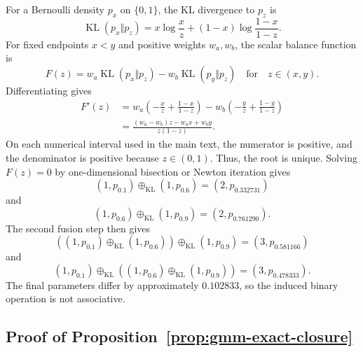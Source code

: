 \documentclass[runningheads]{llncs}
\newcommand{\KL}{\operatorname{KL}}
\begin{document}
For a Bernoulli density $p_x$ on $\{0,1\}$, the KL divergence to $p_z$ is
\begin{equation*}
  \KL(p_x\Vert p_z)=x\log\frac{x}{z}+(1-x)\log\frac{1-x}{1-z}.
\end{equation*}
For fixed endpoints $x<y$ and positive weights $w_a,w_b$, the scalar balance function is
\begin{equation*}
  F(z)=w_a\KL(p_x\Vert p_z)-w_b\KL(p_y\Vert p_z)
  \quad\text{for}\quad z\in(x,y).
\end{equation*}
Differentiating gives
\begin{align*}
  F'(z)
  &=w_a\left(-\frac{x}{z}+\frac{1-x}{1-z}\right)
    -w_b\left(-\frac{y}{z}+\frac{1-y}{1-z}\right)\\
  &=\frac{(w_a-w_b)z-w_ax+w_by}{z(1-z)}.
\end{align*}
On each numerical interval used in the main text, the numerator is positive, and the denominator is positive because $z\in(0,1)$. Thus, the root is unique. Solving $F(z)=0$ by one-dimensional bisection or Newton iteration gives
\begin{equation*}
  (1,p_{0.1})\oplus_{\KL}(1,p_{0.6})=(2,p_{0.332731})
\end{equation*}
and
\begin{equation*}
  (1,p_{0.6})\oplus_{\KL}(1,p_{0.9})=(2,p_{0.761290}).
\end{equation*}
The second fusion step then gives
\begin{equation*}
  ((1,p_{0.1})\oplus_{\KL}(1,p_{0.6}))\oplus_{\KL}(1,p_{0.9})=(3,p_{0.581166})
\end{equation*}
and
\begin{equation*}
  (1,p_{0.1})\oplus_{\KL}((1,p_{0.6})\oplus_{\KL}(1,p_{0.9}))=(3,p_{0.478333}).
\end{equation*}
The final parameters differ by approximately $0.102833$, so the induced binary operation is not associative.

\subsection*{Proof of Proposition~\ref{prop:gmm-exact-closure}}
\end{document}
